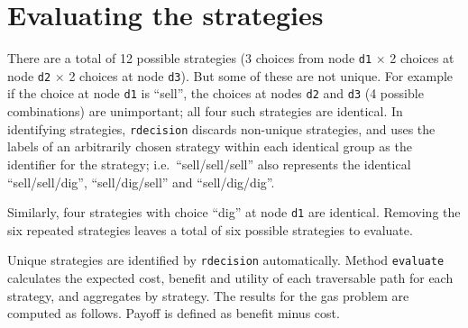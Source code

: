 \documentclass[
]{article}
\newenvironment{Shaded}{\begin{snugshade}}{\end{snugshade}}
\newcommand{\CommentTok}[1]{\textcolor[rgb]{0.56,0.35,0.01}{\textit{#1}}}
\newcommand{\DataTypeTok}[1]{\textcolor[rgb]{0.13,0.29,0.53}{#1}}
\newcommand{\DecValTok}[1]{\textcolor[rgb]{0.00,0.00,0.81}{#1}}
\newcommand{\KeywordTok}[1]{\textcolor[rgb]{0.13,0.29,0.53}{\textbf{#1}}}
\newcommand{\NormalTok}[1]{#1}
\newcommand{\OperatorTok}[1]{\textcolor[rgb]{0.81,0.36,0.00}{\textbf{#1}}}
\newcommand{\StringTok}[1]{\textcolor[rgb]{0.31,0.60,0.02}{#1}}
\begin{document}
\begin{Shaded}
\end{Shaded}

\hypertarget{evaluating-the-strategies}{%
\section{Evaluating the strategies}\label{evaluating-the-strategies}}

There are a total of 12 possible strategies (3 choices from node
\texttt{d1} \(\times\) 2 choices at node \texttt{d2} \(\times\) 2
choices at node \texttt{d3}). But some of these are not unique. For
example if the choice at node \texttt{d1} is ``sell'', the choices at
nodes \texttt{d2} and \texttt{d3} (4 possible combinations) are
unimportant; all four such strategies are identical. In identifying
strategies, \texttt{rdecision} discards non-unique strategies, and uses
the labels of an arbitrarily chosen strategy within each identical group
as the identifier for the strategy; i.e.~``sell/sell/sell'' also
represents the identical ``sell/sell/dig'', ``sell/dig/sell'' and
``sell/dig/dig''.

Similarly, four strategies with choice ``dig'' at node \texttt{d1} are
identical. Removing the six repeated strategies leaves a total of six
possible strategies to evaluate.

Unique strategies are identified by \texttt{rdecision} automatically.
Method \texttt{evaluate} calculates the expected cost, benefit and
utility of each traversable path for each strategy, and aggregates by
strategy. The results for the gas problem are computed as follows.
Payoff is defined as benefit minus cost.
\end{document}
